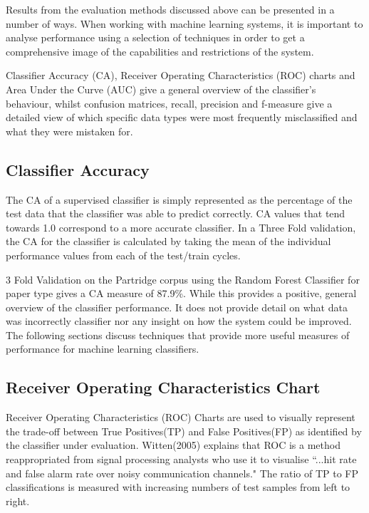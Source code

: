 Results from the evaluation methods discussed above can be presented in a
number of ways. When working with machine learning systems, it is important to
analyse performance using a selection of techniques in order to get a
comprehensive image of the capabilities and restrictions of the system.

Classifier Accuracy (CA), Receiver Operating Characteristics
(ROC) charts and Area Under the Curve (AUC) give a general overview of the
classifier's behaviour, whilst confusion matrices, recall, precision and
f-measure give a detailed view of which specific data types were most
frequently misclassified and what they were mistaken for. 

\subsection{ Classifier Accuracy } 

The CA of a supervised classifier is simply represented as the percentage of
the test data that the classifier was able to predict correctly. CA values that
tend towards 1.0 correspond to a more accurate classifier. In a Three Fold
validation, the CA for the classifier is calculated by taking the mean of the
individual performance values from each of the test/train cycles. 

3 Fold Validation on the Partridge corpus using the Random Forest Classifier
for paper type gives a CA measure of 87.9\%. While this provides a positive,
general overview of the classifier performance. It does not provide detail on
what data was incorrectly classifier nor any insight on how the system could be
improved. The following sections discuss techniques that provide more useful
measures of performance for machine learning classifiers.

\subsection{ Receiver Operating Characteristics Chart}

Receiver Operating Characteristics (ROC) Charts are used to visually represent
the trade-off between True Positives(TP) and False Positives(FP) as identified
by the classifier under evaluation. Witten(2005) explains that ROC is a method
reappropriated from signal processing analysts who use it to visualise ``...hit
rate and false alarm rate over noisy communication
channels\cite{witten2005data}." The ratio of TP to FP classifications is
measured with increasing numbers of test samples from left to right. 


